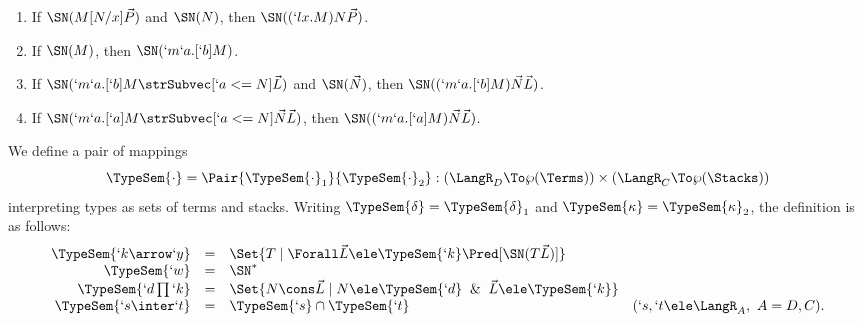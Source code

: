 \documentclass{lmcs}
\newcommand{\vect}[1]{\vec{#1}}
\begin{document}
 \begin{prop} \label{SN facts}

 \begin{enumerate}

 \firstitem \label{SN fact head application}
If $\SN(x\vect{ M })$ and $\SN(\vect{N})$, then $\SN(x\vect{ M }\vect{N})$.

 \item \label{SN fact redex}
If $\SN(M[N/x]\vect{P})$ and $\SN(N)$, then $\SN({( `lx.M)N\vect{P}})$.

 \item \label{SN fact add mu abstraction}
If $\SN(M)$, then $\SN(`m`a.[`b]M)$.

 \item \label{SN fact mu in redex}
If $\SN( `m`a.[`b]M \strSubvec[ `a <= N ] \vect{L} ) $ and $ \SN(\vect{N}) $, then $ \SN({( `m`a.[`b]M )\vect{N}\vect{L}}) $.

 \item \label{SN fact mu out redex}
If $\SN(`m`a.[`a]M \strSubvec[ `a <= N ] \vect{N} \vect{L} ) $, then $ \SN({( `m`a.[`a]M )\vect{N}\vect{L}}) $.

 \end{enumerate}
 \end{prop}


 \begin{defi} \label{TypeSem definition}
We define a pair of mappings 
 \[ \TypeSem{\cdot} = \Pair{\TypeSem{\cdot}_1}{\TypeSem{\cdot}_2}: (\LangR_D \To \wp(\Terms)) \times (\LangR_C \To \wp(\Stacks)) \] 
interpreting types as sets of terms and stacks. 
Writing $\TypeSem{\delta} = \TypeSem{\delta}_1$ and $\TypeSem{\kappa} = \TypeSem{\kappa}_2$, the definition is 
as follows:
%
 \[ \begin{array}{rcl@{\quad}l}
 \TypeSem{`k\arrow `y} &=& \Set{T \mid \Forall \vect{L} \ele \TypeSem{`k } \Pred[\SN(T \vect{L}) ] } 
 \\ 
 \TypeSem{`w} &=& \SN^* 
	\\
 \TypeSem{`d\prod `k } &=& \Set{N \cons \vect{L} \mid N \ele \TypeSem{`d} \And \vect{L} \ele \TypeSem{`k }} 
 \\ 
 \TypeSem{`s \inter `t} &=& \TypeSem{`s} \cap \TypeSem{`t} & (`s,`t \ele \LangR_A,~ A = D,C). 
 \end{array} \]

 \end{defi}
\end{document}
